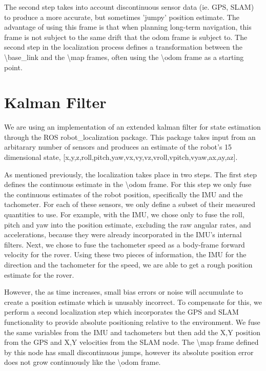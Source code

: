 The second step takes into account discontinuous sensor data (ie. GPS, SLAM) to produce a more accurate, but sometimes 'jumpy' position estimate. The advantage of using this frame is that when planning long-term navigation, this frame is not subject to the same drift that the odom frame is subject to. The second step in the localization process defines a transformation between the \textbackslash base\_link and the \textbackslash map frames, often using the \textbackslash odom frame as a starting point.

\section{Kalman Filter}

We are using an implementation of an extended kalman filter for state estimation through the ROS robot\_localization package. This package takes input from an arbitarary number of sensors and produces an estimate of the robot's 15 dimensional state, [x,y,z,roll,pitch,yaw,vx,vy,vz,vroll,vpitch,vyaw,ax,ay,az]\cite{Moore2016}. 

As mentioned previously, the localization takes place in two steps. The first step defines the continuous estimate in the \textbackslash odom frame. For this step we only fuse the continuous estimates of the robot position, specifically the IMU and the tachometer. For each of these sensors, we only define a subset of their measured quantities to use. For example, with the IMU, we chose only to fuse the roll, pitch and yaw into the position estimate, excluding the raw angular rates, and accelerations, because they were already incorporated in the IMU's internal filters. Next, we chose to fuse the tachometer speed as a body-frame forward velocity for the rover. Using these two pieces of information, the IMU for the direction and the tachometer for the speed, we are able to get a rough position estimate for the rover. 

However, the as time increases, small bias errors or noise will accumulate to create a position estimate which is unusably incorrect. To compensate for this, we perform a second localization step which incorporates the GPS and SLAM functionality to provide absolute positioning relative to the environment. We fuse the same variables from the IMU and tachometers but then add the X,Y position from the GPS and X,Y velocities from the SLAM node. The \textbackslash map frame defined by this node has small discontinuous jumps, however its absolute position error does not grow continuously like the \textbackslash odom frame.

